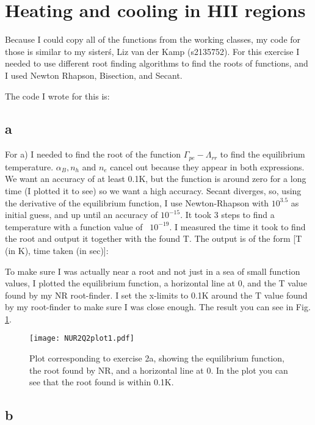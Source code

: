 \section{Heating and cooling in HII regions}

Because I could copy all of the functions from the working classes, 
my code for those is similar to my sister\'s, Liz van der Kamp (s2135752). 
For this exercise I needed to use different root finding algorithms to find the roots of functions, and I 
used Newton Rhapson, Bisection, and Secant.

The code I wrote for this is:


\subsection*{a}

For a) I needed to find the root of the function $\Gamma_{pe} - \Lambda_{rr}$ to find the equilibrium 
temperature. $\alpha_B, n_h$ and $n_e$ cancel out because they appear in both expressions.
We want an accuracy of at least 0.1K, but the function is around zero for a long time (I plotted it to see) 
so we want a high accuracy.
Secant diverges, so, using the derivative of the equilibrium function, I use Newton-Rhapson with $10^{3.5}$ as initial guess, and up until an accuracy of $10^{-15}$. It took 3 steps to find a temperature with a function value of ~$10^{-19}$. I measured the time it took to find the root and output it together with the found T. The output is of the form [T (in K), time taken (in sec)]:


To make sure I was actually near a root and not just in a sea of small function values, I plotted the 
equilibrium function, a horizontal line at 0, and the T value found by my NR root-finder. I set the 
x-limits to 0.1K around the T value found by my root-finder to make sure I was close enough.
The result you can see in Fig. \ref{fig:fig1}.

\begin{figure}[h!]
  \centering
  \texttt{[image: NUR2Q2plot1.pdf]}
  \caption{Plot corresponding to exercise 2a, showing the equilibrium function, the root found by NR, and
  a horizontal line at 0. In the plot you can see that the root found is within 0.1K.}
  \label{fig:fig1}
\end{figure} 


\subsection*{b}

